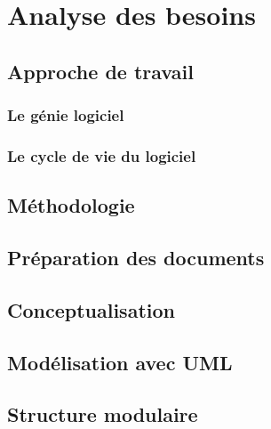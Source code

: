 \chapter{Analyse des besoins}
        \section{Approche de travail}
                \subsection{Le génie logiciel}
                        
                \subsection{Le cycle de vie du logiciel}
                        
        \section{Méthodologie}
                
        \section{Préparation des documents}
                
        \section{Conceptualisation}
                
        \section{Modélisation avec UML}
                
        \section{Structure modulaire}
                
              

        
 